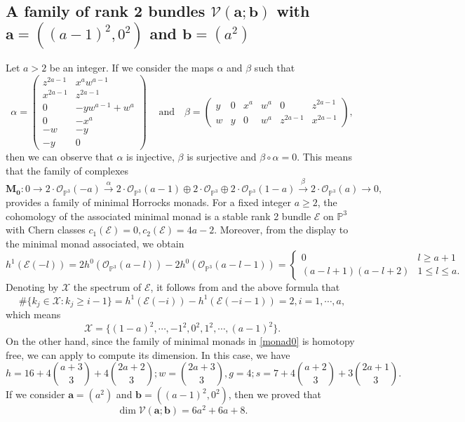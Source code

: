 \documentclass[twoside,reqno]{amsart}
\theoremstyle{plain}
\begin{document}
 \subsection{A family of rank 2 bundles $\mathcal{V}(\boldsymbol{a};\boldsymbol{b})$ with $\boldsymbol{a}=({(a-1)}^2,0^2)$ and $\boldsymbol{b}=(a^2)$}\label{family1}
Let $a>2$ be an integer. If we consider the maps $\alpha$ and $\beta$ such that
 $$\alpha=\begin{pmatrix}
     z^{2a-1}&x^aw^{a-1}\\
     x^{2a-1}& z^{2a-1}\\
     0& -yw^{a-1}+w^a\\ 
     0&-x^a\\
     -w&-y\\
     -y&0
     \end{pmatrix}\ \ \ \ \mbox{ and } \ \ \ \beta=\begin{pmatrix}
         y & 0 & x^a & w^a & 0 & z^{2a-1}\\
         w&y&0&w^a&z^{2a-1}&x^{2a-1}
     \end{pmatrix},$$
then we can observe that $\alpha$ is injective, $\beta$ is surjective and $\beta\circ\alpha=0$. This means that the family of complexes  
\begin{equation}\label{monad0}
\mathbf{M_0}:0\rightarrow2\cdot\mathcal{O}_{\mathbb{P}^{3}}(-a)\stackrel{\alpha}{\rightarrow}2\cdot\mathcal{O}_{\mathbb{P}^{3}}(a-1)\oplus2\cdot\mathcal{O}_{\mathbb{P}^{3}}\oplus 2\cdot\mathcal{O}_{\mathbb{P}^{3}}(1-a)\stackrel{\beta}{\rightarrow}2\cdot\mathcal{O}_{\mathbb{P}^{3}}(a)\rightarrow0,
\end{equation}
provides a family of minimal Horrocks monads. For a fixed integer $a\geq2$, the cohomology of the associated  minimal monad is a 
stable rank 2 bundle $\mathcal{E}$ on $\mathbb{P}^3$ with Chern 
classes $c_1(\mathcal{E})=0, c_2(\mathcal{E})=4a-2$. Moreover, from the display to the minimal monad associated, we obtain
$$h^1(\mathcal{E}(-l))=2h^0(\mathcal{O}_{\mathbb{P}^{3}}(a-l))-2h^0(\mathcal{O}_{\mathbb{P}^{3}}(a-l-1))=\left\{\begin{array}{cc}
  0   & l\geq a+1 \\
  (a-l+1)(a-l+2)   & 1\leq l\leq a. 
\end{array}
\right.$$
Denoting by $\mathcal{X}$ the spectrum of $\mathcal{E}$, it follows from \cite[Property S4]{HR91} and the above formula that
$$\#\{k_j\in\mathcal{X}:k_j\geq i-1\}=h^1(\mathcal{E}(-i))-h^1(\mathcal{E}(-i-1))=2, i=1,\cdots, a,$$
which means
$$\mathcal{X}=\{{(1-a)}^2,\cdots,-1^2,0^2,1^2,\cdots, {(a-1)}^2\}.$$
On the other hand, since the family of minimal monads in \eqref{monad0} is homotopy free, we can apply 
\cite[formula 33]{MF2021} to compute its dimension. In this case, we have
\begin{equation*}
h=16+4\binom{a+3}{3}+4\binom{2a+2}{3}; w=\binom{2a+3}{3}, g=4; s=7+4\binom{a+2}{3}+3\binom{2a+1}{3}.
\end{equation*}
If we consider $\boldsymbol{a}=(a^2)$ and $\boldsymbol{b}=({(a-1)}^2,0^2)$, then we proved that
\begin{equation}\label{dim-f}
\dim\mathcal{V}(\boldsymbol{a}; \boldsymbol{b})=6a^2+6a+8.    
\end{equation}
 
\end{document}
